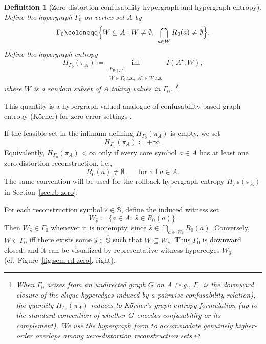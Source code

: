 \documentclass[twoside]{article}
\newtheorem{definition}[theorem]{Definition}
\newcommand{\1}{\mathbf{1}}
\begin{document}
\begin{definition}[Zero-distortion confusability hypergraph and hypergraph entropy]
\label{def:gamma0}
Define the hypergraph \(\Gamma_0\) on vertex set \(A\) by
\[
\Gamma_0 \coloneqq \Bigl\{ W\subseteq A: W\neq\emptyset,\ \bigcap_{a\in W}R_0(a)\neq\emptyset \Bigr\}.
\]
Define the hypergraph entropy
\[
H_{\Gamma_0}(\pi_A)\coloneqq 
\inf_{\substack{P_{W\mid A^\star}:\\ W\in\Gamma_0\ \text{a.s.},\ A^\star\in W\ \text{a.s.}}}
I(A^\star;W),
\]
where \(W\) is a random subset of \(A\) taking values in \(\Gamma_0\).
\footnote{When \(\Gamma_0\) arises from an undirected graph \(G\) on \(A\) (e.g., \(\Gamma_0\) is the downward closure of the clique
hyperedges induced by a pairwise confusability relation), the quantity \(H_{\Gamma_0}(\pi_A)\) reduces to K\"orner's graph-entropy
formulation (up to the standard convention of whether \(G\) encodes confusability or its complement).
We use the hypergraph form to accommodate genuinely higher-order overlaps among zero-distortion reconstruction sets.}
\end{definition}

This quantity is a hypergraph-valued analogue of confusability-based graph entropy (K\"orner) for zero-error settings \cite{korner1971coding,csiszar2011information}.

If the feasible set in the infimum defining \(H_{\Gamma_0}(\pi_A)\) is empty, we set
\[
H_{\Gamma_0}(\pi_A)\coloneqq +\infty.
\]
Equivalently, \(H_{\Gamma_0}(\pi_A)<\infty\) only if every core symbol \(a\in A\) has at least one zero-distortion
reconstruction, i.e.,
\[
R_0(a)\neq\emptyset \qquad \text{for all } a\in A.
\]
The same convention will be used for the rollback hypergraph entropy
\(H_{\Gamma^{\mathrm{rb}}_0}(\pi_A)\) in Section~\ref{sec:rb-zero}.

For each reconstruction symbol \(\hat s\in \hat{\mathbb{S}}\), define the induced witness set
\[
W_{\hat s}\coloneqq \{a\in A:\ \hat s\in R_0(a)\}.
\]
Then \(W_{\hat s}\in \Gamma_0\) whenever it is nonempty, since \(\hat s\in\bigcap_{a\in W_{\hat s}}R_0(a)\).
Conversely, \(W\in\Gamma_0\) iff there exists some \(\hat s\in\hat{\mathbb{S}}\) such that \(W\subseteq W_{\hat s}\).
Thus \(\Gamma_0\) is downward closed, and it can be visualized by representative witness hyperedges \(W_{\hat s}\)
(cf.\ Figure~\ref{fig:sem-rd-zero}, right).
\end{document}
